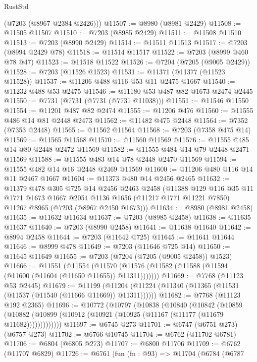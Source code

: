 \begin{lexlean}{RustStd}
\begin{coremodule}
      (@7203 (@8967 @2384 @2426)))
@11507 := @8980 (@8981 @2429)
@11508 := @11505 @11507
@11510 := @7203 (@8985 @2429)
@11511 := @11508 @11510
@11513 := @7203 (@8990 @2429)
@11514 := @11511 @11513
@11517 := @7203 (@8994 @2429 @78)
@11518 := @11514 @11517
@11522 := @7203 (@8999 @460 @78 @47)
@11523 := @11518 @11522
@11526 := @7204 (@7205 (@9005 @2429))
@11528 := @7203 (@11526 @1523)
@11531 := @11371 (@11377 (@11523 @11528))
@11537 := @11206 @488 @116 @53 @11 @2475 @1667
@11540 := @11232 @488 @53 @2475
@11546 := @11180 @53 @487 @82 @1673 @2474 @2445
@11550 := @7731 (@7731 (@7731 (@7731 @11038)))
@11551 := @11546 @11550
@11554 := @11201 @487 @82 @2474
@11555 := @11206 @476
@11560 := @11555 @486 @14 @81 @2448 @2473
@11562 := @11482 @475 @2448
@11564 := @7352 (@7353 @2448)
@11565 := @11562 @11564
@11568 := @7203 (@7358 @475 @14)
@11569 := @11565 @11568
@11570 := @11560 @11569
@11576 := @11555 @485 @14 @80 @2448 @2472 @11569
@11582 := @11555 @484 @14 @79 @2448 @2471 @11569
@11588 := @11555 @483 @14 @78 @2448 @2470 @11569
@11594 := @11555 @482 @14 @16 @2448 @2469 @11569
@11600 := @11206 @480 @116 @14 @11 @2467 @1667
@11604 := @11373 @480 @14 @2456 @2465
@11632 := @11379
    @478
    @305
    @725
    @14
    @2456
    @2463
    @2458
    (@11388
      @129
      @116
      @35
      @11
      @1771
      @1673
      @1667
      @2054
      @1136
      @1656
      (@11217 @1771 @11221 @7850)
      @11267
      @8965
      (@7203 (@8967 @2450 @1673)))
@11634 := @8980 (@8981 @2458)
@11635 := @11632 @11634
@11637 := @7203 (@8985 @2458)
@11638 := @11635 @11637
@11640 := @7203 (@8990 @2458)
@11641 := @11638 @11640
@11642 := @8994 @2458
@11644 := @7203 (@11642 @725)
@11645 := @11641 @11644
@11646 := @8999 @478
@11649 := @7203 (@11646 @725 @14)
@11650 := @11645 @11649
@11655 := @7203 (@7204 (@7205 (@9005 @2458)) @1523)
@11666 := @11551
    (@11554 (@11570 (@11576 (@11582 (@11588 (@11594 (@11600 (@11604 (@11650 @11655)) @11311)))))))
@11669 := @7768 (@11123 @53 @2445)
@11679 := @11199
    (@11204 (@11224 (@11340 (@11365 (@11531 (@11537 (@11540 (@11666 @11669)) @11311))))))
@11682 := @7768 (@11123 @192 @2365)
@11696 := @10772
    (@10797
      (@10838
        (@10840
          (@10842
            (@10859
              (@10882 (@10899 (@10912 (@10921 (@10925 (@11167 (@11177 (@11679 @11682)))))))))))))
@11697 := @6745 @273
@11701 := @6747 (@6751 @273) (@6757 @273)
@11702 := @6766 @10745
@11704 := @6762 (@11702 @6781)
@11706 := @6804 (@6805 @273)
@11707 := @6800 @11706
@11709 := @6762 (@11707 @6829)
@11726 := @6761
    (fun (fn : @93) =>
    @11704
      (@6784
        (@6787

\end{coremodule}
\end{lexlean}
